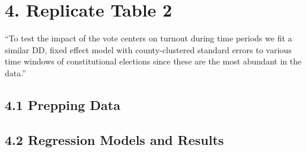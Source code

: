 \documentclass[
]{article}
\newenvironment{Shaded}{\begin{snugshade}}{\end{snugshade}}
\newcommand{\CommentTok}[1]{\textcolor[rgb]{0.56,0.35,0.01}{\textit{#1}}}
\newcommand{\DataTypeTok}[1]{\textcolor[rgb]{0.13,0.29,0.53}{#1}}
\newcommand{\DecValTok}[1]{\textcolor[rgb]{0.00,0.00,0.81}{#1}}
\newcommand{\KeywordTok}[1]{\textcolor[rgb]{0.13,0.29,0.53}{\textbf{#1}}}
\newcommand{\NormalTok}[1]{#1}
\newcommand{\OperatorTok}[1]{\textcolor[rgb]{0.81,0.36,0.00}{\textbf{#1}}}
\newcommand{\StringTok}[1]{\textcolor[rgb]{0.31,0.60,0.02}{#1}}
\begin{document}
\hypertarget{replicate-table-2}{%
\section{4. Replicate Table 2}\label{replicate-table-2}}

``To test the impact of the vote centers on turnout during time periods
we fit a similar DD, fixed effect model with county-clustered standard
errors to various time windows of constitutional elections since these
are the most abundant in the data.''

\hypertarget{prepping-data}{%
\subsection{4.1 Prepping Data}\label{prepping-data}}

\begin{Shaded}
\end{Shaded}

\hypertarget{regression-models-and-results}{%
\subsection{4.2 Regression Models and
Results}\label{regression-models-and-results}}
\end{document}
